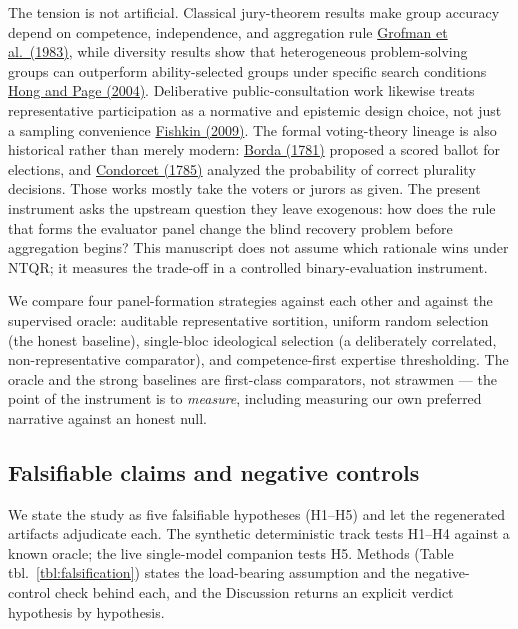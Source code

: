 \documentclass[
]{article}
\begin{document}
The tension is not artificial. Classical jury-theorem results make group
accuracy depend on competence, independence, and aggregation rule
\href{https://doi.org/10.1007/BF00125672}{Grofman et al.~(1983)}, while
diversity results show that heterogeneous problem-solving groups can
outperform ability-selected groups under specific search conditions
\href{https://doi.org/10.1073/pnas.0403723101}{Hong and Page (2004)}.
Deliberative public-consultation work likewise treats representative
participation as a normative and epistemic design choice, not just a
sampling convenience
\href{https://global.oup.com/academic/product/when-the-people-speak-9780199604432}{Fishkin
(2009)}. The formal voting-theory lineage is also historical rather than
merely modern:
\href{https://bibbase.org/network/publication/denbspborda-mmoiresurleslectionsauscrutin-1781}{Borda
(1781)} proposed a scored ballot for elections, and
\href{https://archive.org/details/bub_gb_RzAVAAAAQAAJ}{Condorcet (1785)}
analyzed the probability of correct plurality decisions. Those works
mostly take the voters or jurors as given. The present instrument asks
the upstream question they leave exogenous: how does the rule that forms
the evaluator panel change the blind recovery problem before aggregation
begins? This manuscript does not assume which rationale wins under NTQR;
it measures the trade-off in a controlled binary-evaluation instrument.

We compare four panel-formation strategies against each other and
against the supervised oracle: auditable representative sortition,
uniform random selection (the honest baseline), single-bloc ideological
selection (a deliberately correlated, non-representative comparator),
and competence-first expertise thresholding. The oracle and the strong
baselines are first-class comparators, not strawmen --- the point of the
instrument is to \emph{measure}, including measuring our own preferred
narrative against an honest null.

\subsection{Falsifiable claims and negative
controls}\label{falsifiable-claims-and-negative-controls}

We state the study as five falsifiable hypotheses (H1--H5) and let the
regenerated artifacts adjudicate each. The synthetic deterministic track
tests H1--H4 against a known oracle; the live single-model companion
tests H5. Methods (Table tbl.~\ref{tbl:falsification}) states the
load-bearing assumption and the negative-control check behind each, and
the Discussion returns an explicit verdict hypothesis by hypothesis.
\end{document}
